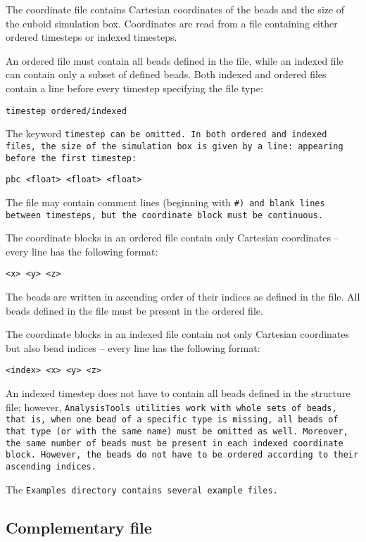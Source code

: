 The coordinate file contains Cartesian coordinates of the beads and the
size of the cuboid simulation box.
Coordinates are read from a \vcf file
containing either ordered timesteps or
indexed timesteps.

An ordered \vcf file must contain all beads defined in the \vsf file, while
an indexed \vcf file can contain only a subset of defined beads. Both
indexed and ordered \vcf files contain a line before every timestep
specifying the file type:
\begin{verbatim}timestep ordered/indexed\end{verbatim}
The keyword \tt{timestep} can be omitted.  In
both ordered and indexed \vcf files, the size of the simulation box is
given by a line: appearing before the first timestep:
\begin{verbatim}pbc <float> <float> <float>\end{verbatim}

The \vcf file may contain comment lines (beginning with
\tt{\#}) and blank lines between timesteps, but the coordinate block
must be continuous.

The coordinate blocks in an ordered \vcf file contain only Cartesian
coordinates -- every line has the following format:
\begin{verbatim}<x> <y> <z>\end{verbatim}
The beads are written in ascending order of their indices as defined in the
\vsf file. All beads defined in the \vsf file must be present in the
ordered \vcf file.

The coordinate blocks in an indexed \vcf file contain not only Cartesian
coordinates but also bead indices -- every line has the following format:
\begin{verbatim}<index> <x> <y> <z>\end{verbatim} An indexed timestep does
not have to contain all beads defined in the \vsf structure file; however,
\tt{AnalysisTools} utilities work with whole sets of beads, that is, when
one bead of a specific type is missing, all beads of that type (or with the
same name) must be omitted as well. Moreover, the same number of beads must
be present in each indexed coordinate block. However, the beads do not have
to be ordered according to their ascending indices.

The \tt{Examples} directory contains several example \vtf files. %

\subsection{Complementary \field file} %

